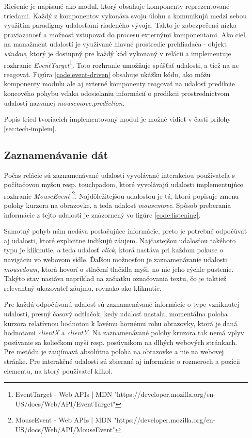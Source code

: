 Riešenie je napísané ako modul, ktorý obsahuje komponenty reprezentované triedami. Každý z komponentov vykonáva svoju úlohu a komunikujú medzi sebou využitím paradigmy udalosťami riadeného vývoja. Takto je zabezpečená nízka praviazanosť a možnosť vstupovať do procesu externými komponentami. Ako cieľ na manažment udalostí je využívané hlavné prostredie prehliadača - objekt \emph{window}, ktorý je dostupný pre každý kód vykonaný v relácii a implementuje rozhranie \emph{EventTarget}\footnote{EventTarget - Web APIs | MDN "https://developer.mozilla.org/en-US/docs/Web/API/EventTarget"}. Toto rozhranie umožňuje spúšťať udalosti, a tiež na ne reagovať. Figúra \ref{code:event-driven} obsahuje ukážku kódu, ako môžu komponenty modulu ale aj externé komponenty reagovať na udalosť predikcie koncového pohybu vďaka odosielaniu informácií o predikcii prostredníctvom udalosti nazvanej \emph{mousemove.prediction}.

Popis tried tvoriacich implementovaný modul je možné vidieť v časti prílohy \ref{sec:tech-implem}.

\subsection{Zaznamenávanie dát}
Počas relácie sú zaznamenávané udalosti vyvolávané interakciou používateľa s počítačovou myšou resp. touchpadom, ktoré vyvolávajú udalosti implementujúce rozhranie \emph{MouseEvent} \footnote{MouseEvent - Web APIs | MDN "https://developer.mozilla.org/en-US/docs/Web/API/MouseEvent"}. Najdôležitejšou udalosťou je tá, ktorá popisuje zmenu polohy kurzora na obrazovke, a teda udalosť \emph{mousemove}. Spôsob preberania informácie z tejto udalosti je znázornený vo figúre \ref{code:listening}. 

Samotný pohyb nám nedáva postačujúce informácie, preto je potrebné odpočúvať aj udalosti, ktoré explicitne indikujú záujem. Najčastejšou udalosťou takéhoto typu je kliknutie, a teda udalosť \emph{click}, ktorá nastáva pri každom pokuse o navigáciu vo webovom sídle. Ďaľšou možnosťou je zaznamenávanie udalosti \emph{mousedown}, ktorá hovorí o stlačení tlačidla myši, no nie jeho rýchle pustenie. Takýto stav nastáva napríklad na začiatku označovania textu, čo je taktiež relevantný ukazovateľ záujmu, rovnako ako kliknutie.

Pre každú odpočúvanú udalosť sú zaznamenávané informácie o type vzniknutej udalosti, presný časový odtlačok, kedy udalosť nastala, momentálna poloha kurzora relatívnou hodnotou k ľavému hornému rohu obrazovky, ktorá je daná hodnotami \emph{clientX} a \emph{clientY}.  Na zaznamenávané polohy kruzora tak nemá vplyv posúvanie sa koliečkom myši resp. posúvnikom na dlhých webových stránkach. Pre metódu je zaujímavá absolútna poloha na obrazovke a nie na webovej stránke. Pre interakčné udalosti sú zbierané aj informácie o rozmeroch a pozícii elementu, na ktorý používateľ klikol.

